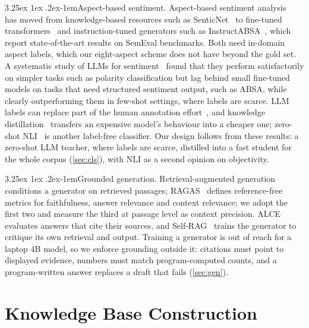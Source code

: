 \documentclass[10pt,twocolumn,a4paper]{article}
\makeatletter
\renewcommand\paragraph{\@startsection{paragraph}{4}{\parindent}%
  {3.25ex \@plus 1ex \@minus .2ex}{-1em}{\normalfont\normalsize\bfseries}}
\makeatother
\begin{document}
\paragraph{Aspect-based sentiment.} Aspect-based sentiment analysis~\cite{pontiki2014,zhang2023absasurvey} has moved
from knowledge-based resources such as SenticNet~\cite{senticnet} to fine-tuned transformers~\cite{xu2019bert} and
instruction-tuned generators such as InstructABSA~\cite{instructabsa}, which report state-of-the-art results on SemEval benchmarks. Both need
in-domain aspect labels, which our eight-aspect scheme does not have beyond the gold set. A systematic study of LLMs for
sentiment~\cite{zhang2024reality} found that they perform satisfactorily on simpler tasks such as polarity classification but lag
behind small fine-tuned models on tasks that need structured sentiment output, such as ABSA, while clearly
outperforming them in few-shot settings, where labels are scarce. LLM labels can replace part of the human
annotation effort~\cite{gilardi2023}, and knowledge distillation~\cite{hinton2015} transfers an expensive model's
behaviour into a cheaper one; zero-shot NLI~\cite{yin2019,laurer2023} is another label-free classifier. Our design
follows from these results: a zero-shot LLM teacher, where labels are scarce, distilled into a fast student for the
whole corpus (\cref{sec:cls}), with NLI as a second opinion on objectivity.

\paragraph{Grounded generation.} Retrieval-augmented generation~\cite{rag} conditions a generator on retrieved
passages; RAGAS~\cite{ragas} defines reference-free metrics for faithfulness, answer relevance and
context relevance; we adopt the first two and measure the third at passage level as context precision. ALCE~\cite{alce} evaluates answers that cite their sources, and Self-RAG~\cite{selfrag}
trains the generator to critique its own retrieval and output. Training a generator is out of reach for a laptop 4B
model, so we enforce grounding outside it: citations must point to displayed evidence, numbers must match
program-computed counts, and a program-written answer replaces a draft that fails (\cref{sec:gen}).

\section{Knowledge Base Construction}
\label{sec:kb}
\end{document}
